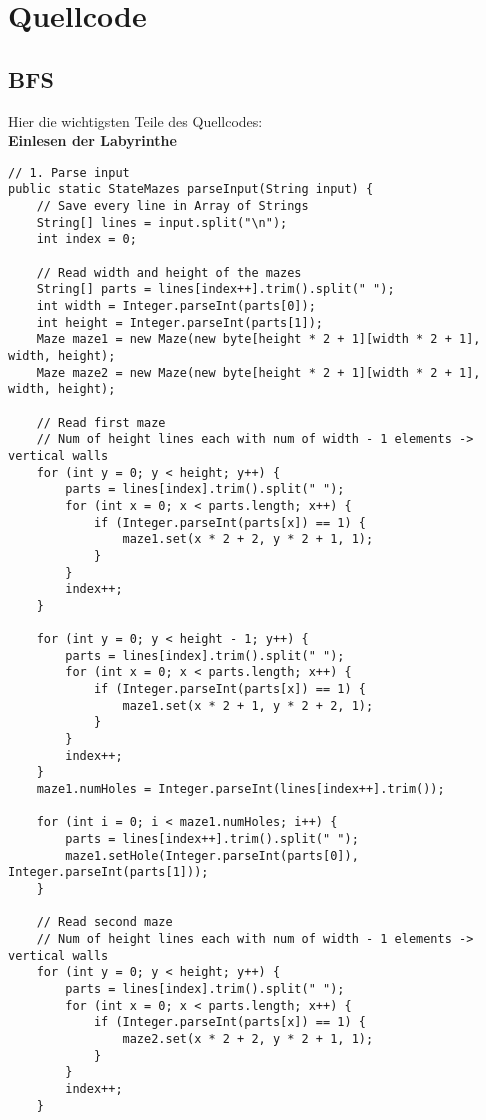 \documentclass[a4paper,10pt,ngerman]{scrartcl}
\begin{document}
\section{Quellcode}
\subsection{BFS}
Hier die wichtigsten Teile des Quellcodes:\\

\textbf{Einlesen der Labyrinthe}
\begin{lstlisting}
// 1. Parse input
public static StateMazes parseInput(String input) {
    // Save every line in Array of Strings
    String[] lines = input.split("\n");
    int index = 0;

    // Read width and height of the mazes
    String[] parts = lines[index++].trim().split(" ");
    int width = Integer.parseInt(parts[0]);
    int height = Integer.parseInt(parts[1]);
    Maze maze1 = new Maze(new byte[height * 2 + 1][width * 2 + 1], width, height);
    Maze maze2 = new Maze(new byte[height * 2 + 1][width * 2 + 1], width, height);

    // Read first maze
    // Num of height lines each with num of width - 1 elements -> vertical walls
    for (int y = 0; y < height; y++) {
        parts = lines[index].trim().split(" ");
        for (int x = 0; x < parts.length; x++) {
            if (Integer.parseInt(parts[x]) == 1) {
                maze1.set(x * 2 + 2, y * 2 + 1, 1);
            }
        }
        index++;
    }

    for (int y = 0; y < height - 1; y++) {
        parts = lines[index].trim().split(" ");
        for (int x = 0; x < parts.length; x++) {
            if (Integer.parseInt(parts[x]) == 1) {
                maze1.set(x * 2 + 1, y * 2 + 2, 1);
            }
        }
        index++;
    }
    maze1.numHoles = Integer.parseInt(lines[index++].trim());

    for (int i = 0; i < maze1.numHoles; i++) {
        parts = lines[index++].trim().split(" ");
        maze1.setHole(Integer.parseInt(parts[0]), Integer.parseInt(parts[1]));
    }

    // Read second maze
    // Num of height lines each with num of width - 1 elements -> vertical walls
    for (int y = 0; y < height; y++) {
        parts = lines[index].trim().split(" ");
        for (int x = 0; x < parts.length; x++) {
            if (Integer.parseInt(parts[x]) == 1) {
                maze2.set(x * 2 + 2, y * 2 + 1, 1);
            }
        }
        index++;
    }


\end{lstlisting}
\end{document}
